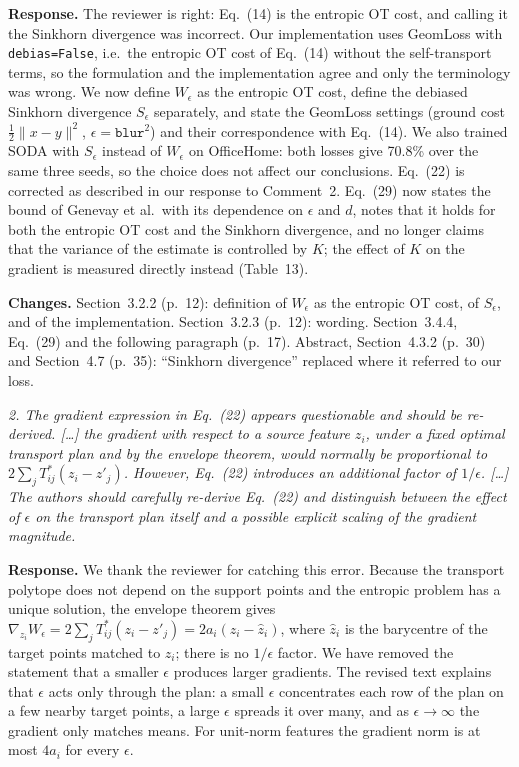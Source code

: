 \documentclass[11pt]{article}
\newenvironment{comment}{\par\medskip\noindent\begin{minipage}{\linewidth}\color{revcol}\itshape}{\end{minipage}\par\smallskip}
\newcommand{\resp}{\noindent\textbf{Response.} }
\newcommand{\chg}{\noindent\textbf{Changes.} }
\begin{document}
\resp The reviewer is right: Eq.~(14) is the entropic OT cost, and calling it the Sinkhorn divergence was incorrect. Our implementation uses GeomLoss with \texttt{debias=False}, i.e.\ the entropic OT cost of Eq.~(14) without the self-transport terms, so the formulation and the implementation agree and only the terminology was wrong. We now define $W_\epsilon$ as the entropic OT cost, define the debiased Sinkhorn divergence $S_\epsilon$ separately, and state the GeomLoss settings (ground cost $\tfrac12\|x-y\|^2$, $\epsilon=\texttt{blur}^2$) and their correspondence with Eq.~(14). We also trained SODA with $S_\epsilon$ instead of $W_\epsilon$ on OfficeHome: both losses give 70.8\% over the same three seeds, so the choice does not affect our conclusions. Eq.~(22) is corrected as described in our response to Comment~2. Eq.~(29) now states the bound of Genevay et al.\ with its dependence on $\epsilon$ and $d$, notes that it holds for both the entropic OT cost and the Sinkhorn divergence, and no longer claims that the variance of the estimate is controlled by $K$; the effect of $K$ on the gradient is measured directly instead (Table~13).

\chg Section~3.2.2 (p.~12): definition of $W_\epsilon$ as the entropic OT cost, of $S_\epsilon$, and of the implementation. Section~3.2.3 (p.~12): wording. Section~3.4.4, Eq.~(29) and the following paragraph (p.~17). Abstract, Section~4.3.2 (p.~30) and Section~4.7 (p.~35): ``Sinkhorn divergence'' replaced where it referred to our loss.

\begin{comment}
2. The gradient expression in Eq.~(22) appears questionable and should be re-derived. [\dots] the gradient with respect to a source feature $z_i$, under a fixed optimal transport plan and by the envelope theorem, would normally be proportional to $2\sum_j T^*_{ij}(z_i-z'_j)$. However, Eq.~(22) introduces an additional factor of $1/\epsilon$. [\dots] The authors should carefully re-derive Eq.~(22) and distinguish between the effect of $\epsilon$ on the transport plan itself and a possible explicit scaling of the gradient magnitude.
\end{comment}

\resp We thank the reviewer for catching this error. Because the transport polytope does not depend on the support points and the entropic problem has a unique solution, the envelope theorem gives $\nabla_{z_i}W_\epsilon=2\sum_jT^*_{ij}(z_i-z'_j)=2a_i(z_i-\hat z_i)$, where $\hat z_i$ is the barycentre of the target points matched to $z_i$; there is no $1/\epsilon$ factor. We have removed the statement that a smaller $\epsilon$ produces larger gradients. The revised text explains that $\epsilon$ acts only through the plan: a small $\epsilon$ concentrates each row of the plan on a few nearby target points, a large $\epsilon$ spreads it over many, and as $\epsilon\to\infty$ the gradient only matches means. For unit-norm features the gradient norm is at most $4a_i$ for every $\epsilon$.
\end{document}
